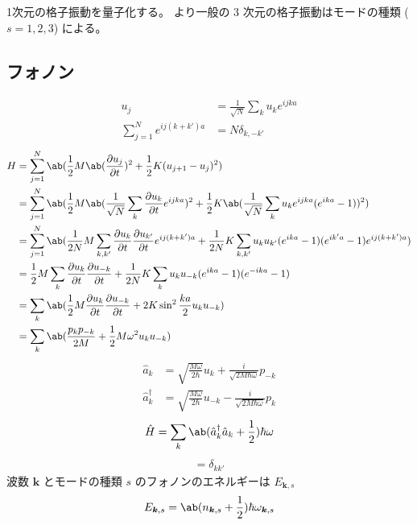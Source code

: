 \documentclass[uplatex,dvipdfmx,a4paper,11pt]{jlreq}
\newcommand{\kk}{\bm{k}}
\numberwithin{equation}{section}
\theoremstyle{definition}
\begin{document}
1次元の格子振動を量子化する。
より一般の 3 次元の格子振動はモードの種類 ($s = 1, 2, 3$) による。

\subsection{フォノン}
\begin{align}
  u_j                            & = \frac{1}{\sqrt{N}}\sum_{k}u_ke^{ijka} \\
  \sum_{j = 1}^N e^{ij(k + k')a} & = N\delta_{k,-k'}
\end{align}
\begin{align}
  H & = \sum_{j = 1}^{N}\ab(\frac{1}{2}M\ab(\diffp{u_j}{t})^2 + \frac{1}{2}K(u_{j+1} - u_j)^2)                                                                                    \\
    & = \sum_{j = 1}^{N}\ab(\frac{1}{2}M\ab(\frac{1}{\sqrt{N}}\sum_{k}\diffp{u_k}{t}e^{ijka})^2 + \frac{1}{2}K\ab(\frac{1}{\sqrt{N}}\sum_{k}u_ke^{ijka}(e^{ika} - 1))^2)          \\
    & = \sum_{j = 1}^{N}\ab(\frac{1}{2N}M\sum_{k,k'}\diffp{u_k}{t}\diffp{u_{k'}}{t}e^{ij(k + k')a} + \frac{1}{2N}K\sum_{k,k'}u_ku_{k'}(e^{ika} - 1)(e^{ik'a} - 1)e^{ij(k + k')a}) \\
    & = \frac{1}{2}M\sum_{k}\diffp{u_k}{t}\diffp{u_{-k}}{t} + \frac{1}{2N}K\sum_{k}u_ku_{-k}(e^{ika} - 1)(e^{-ika} - 1)                                                           \\
    & = \sum_{k}\ab(\frac{1}{2}M\diffp{u_k}{t}\diffp{u_{-k}}{t} + 2K\sin^2\frac{ka}{2}u_ku_{-k})                                                                                  \\
    & = \sum_{k}\ab(\frac{p_{k}p_{-k}}{2M} + \frac{1}{2}M\omega^2u_ku_{-k})
\end{align}
\begin{align}
  \hat{a}_k         & = \sqrt{\frac{M\omega}{2\hbar}}u_k + \frac{i}{\sqrt{2M\hbar\omega}}p_{-k}   \\
  \hat{a}_k^\dagger & = \sqrt{\frac{M\omega}{2\hbar}}u_{-k} - \frac{i}{\sqrt{2M\hbar\omega}}p_{k}
\end{align}
\begin{align}
  \hat{H} = \sum_{k}\ab(\hat{a}_k^\dagger\hat{a}_k + \frac{1}{2})\hbar\omega
\end{align}
\begin{align}
  [a_k, a_{k'}^\dagger] = \delta_{kk'}
\end{align}
波数 $\kk$ とモードの種類 $s$ のフォノンのエネルギーは $E_{\kk,s}$
\begin{align}
  E_{\kk,s} = \ab(n_{\kk,s} + \frac{1}{2})\hbar\omega_{\kk,s}
\end{align}
\end{document}
